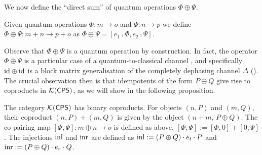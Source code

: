 We now define the ``direct sum'' of quantum operations $\Phi \oplus \Psi$.
\begin{definition}
  Given quantum operations $\Phi: m \to o$ and $\Psi: n \to p$ we define $\Phi
\oplus \Psi: m + n \to p+o$ as $\Phi
\oplus \Psi = [e_1 \comp \Phi, e_2 \comp \Psi]$.
\end{definition}

Observe that $\Phi \oplus \Psi$ is a quantum operation by
construction. In fact,  the operator $\Phi \oplus \Psi$ is a particular case of a
 quantum-to-classical channel , and
specifically $\mathrm{id} \oplus \mathrm{id}$ is a block matrix generalisation of the
completely dephasing channel $\Delta$ (). The crucial
observation then is that idempotents of the form $P \oplus Q$ give rise to
coproducts in $\mathcal{K}{(\mathsf{CPS})}$, as we will show in the following proposition.


\begin{proposition} \label{prop:K(cps)_bin_cop}
        The category $\mathcal{K}{(\mathsf{CPS})}$ has binary coproducts. For objects $(n,P)$ and $(m,Q)$, their coproduct $(n,P) + (m,Q)$ is given by the object $(n+m,\, P \oplus Q)$.  The co-pairing map $[\Phi, \Psi]: m \oplus n \to o$ is defined as  above, $[\Phi, \Psi] := [\Phi, 0] + [0, \Psi]$. The injections $\mathrm{inl}$ and $\mathrm{inr}$ are defined as $\mathrm{inl} := (P \oplus Q)
        \cdot e_l \cdot P$ and $\mathrm{inr} := (P \oplus Q) \cdot e_r \cdot Q$.
\end{proposition}


